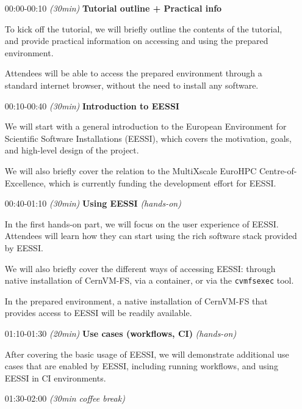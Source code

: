 \begin{itemize}[style=standard, labelwidth=1.9cm]


    \item [00:00-00:10] \emph{(30min)} \textbf{Tutorial outline + Practical info}

        To kick off the tutorial, we will briefly outline the contents of the tutorial,
        and provide practical information on accessing and using the prepared environment.

        Attendees will be able to access the prepared environment through a standard internet browser,
        without the need to install any software.

    \item [00:10-00:40] \emph{(30min)} \textbf{Introduction to EESSI}

        We will start with a general introduction to the European Environment for Scientific Software
        Installations (EESSI), which covers the motivation, goals, and high-level design of the project.

        We will also briefly cover the relation to the MultiXscale EuroHPC Centre-of-Excellence,
        which is currently funding the development effort for EESSI.

    \item [00:40-01:10] \emph{(30min)} \textbf{Using EESSI} \emph{(hands-on)}

        In the first hands-on part, we will focus on the user experience of EESSI.
        Attendees will learn how they can start using the rich software stack provided by EESSI.

        We will also briefly cover the different ways of accessing EESSI: through native installation
        of CernVM-FS, via a container, or via the \texttt{cvmfsexec} tool.

        In the prepared environment, a native installation of CernVM-FS that provides access to EESSI
        will be readily available.

    \item [01:10-01:30] \emph{(20min)} \textbf{Use cases (workflows, CI)} \emph{(hands-on)}

        After covering the basic usage of EESSI, we will demonstrate additional use cases that
        are enabled by EESSI, including running workflows, and using EESSI in CI environments.

 \item [01:30-02:00] \emph{(30min coffee break)}


\end{itemize}
